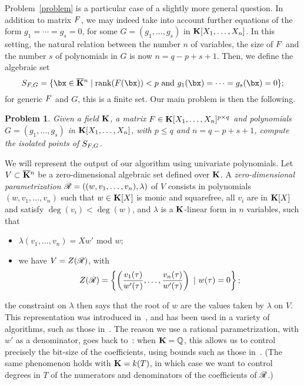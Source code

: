 \documentclass[12pt]{article}
\newtheorem{pbm}{Problem}
\begin{document}
Problem~\ref{problem} is a particular case of a slightly more general
question. In addition to matrix ${F}$, we may indeed take into account
further equations of the form $g_1 =\cdots=g_s=0$,
for some
 $G=(g_1,\dots,g_s)$ in
$\mathbf{K}[X_1,\dots,X_n]$. In this setting, the natural relation between
the number $n$ of variables, the size of ${F}$ and the number $s$ of
polynomials in $G$ is now $n=q-p+s+1$. Then, we define the algebraic
set
$$S_{\mF,G} =  \{\bx \in \KKbar{}^n \mid
\mathrm{rank}(\mF({\bx})) < p \text{~and~}
g_1(\bx)=\cdots=g_s(\bx)=0   \};$$
for generic ${F}$ and $G$, this is a finite set. Our main problem is then
the following.
\begin{pbm} \label{problem2} 
  Given a field $\mathbf{K}$, a matrix ${F} \in \mathbf{K}[X_1,\dots,X_n]^{p \times q}$ and
  polynomials $G=(g_1,\dots,g_s)$ in $\mathbf{K}[X_1,\dots,X_n]$, with $p \leq q$ and
  $n = q-p+s+1$, compute the isolated points of $S_{{F},G}$.
\end{pbm}

We will represent the output of our algorithm using univariate
polynomials. Let $V \subset \overline{\mathbf{K}}{}^n$ be a zero-dimensional
algebraic set defined over $\mathbf{K}$. A \emph{zero-dimensional
  parametrization} $\mathscr{R} = ((w,v_1, \ldots, v_n), \lambda)$ of $V$
consists in polynomials $(w,v_1, \ldots, v_n)$ such that $w \in
\mathbf{K}[X]$ is monic and squarefree, all $v_i$ are in $\mathbf{K}[X]$ and satisfy
$\deg(v_i) < \deg(w)$, and $\lambda$ is a $\mathbf{K}$-linear form in $n$
variables, such that
\begin{itemize}
\item $\lambda(v_1, \ldots, v_n) = Xw'$ mod $w$;
\item we have $V = Z(\mathscr{R})$, with $$Z(\mathscr{R})= \left\{\left(\frac{v_1(\tau)}{w'(\tau)}, \ldots, \frac{v_n(\tau)}{w'(\tau)}\right) \ | \ w(\tau) = 0\right\};$$
\end{itemize}
the constraint on $\lambda$ then says that the root of $w$ are the values
taken by $\lambda$ on $V$. This representation was introduced
in~\cite{Kronecker82,Macaulay16}, and has been used in a variety of
algorithms, such
as those in~\cite{GiMo89,GiHeMoPa95,ABRW,GiHeMoMoPa98,Rouillier99,GiLeSa01}.
The reason we use a rational parametrization, with $w'$ as a
denominator, goes back to~\cite{ABRW, Rouillier99, GiLeSa01}: when
$\mathbf{K}=\mathbb{Q}$, this allows us to control precisely the bit-size of the
coefficients, using bounds such as those
in~\cite{Schost03,DaSc04}. (The same phenomenon holds with $\mathbf{K}=k(T)$,
in which case we want to control degrees in $T$ of the numerators and
denominators of the coefficients of $\mathscr{R}$.)
\end{document}
